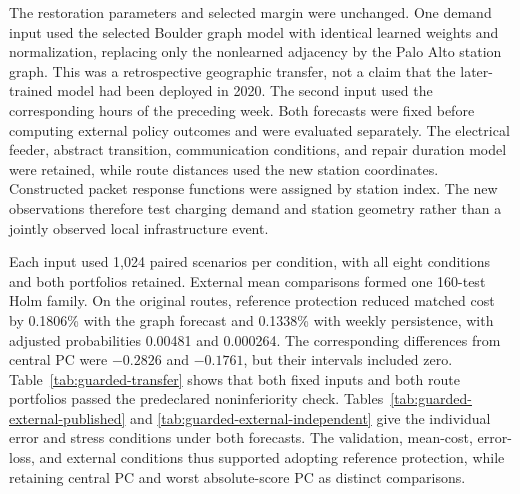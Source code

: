 The restoration parameters and selected margin were unchanged.  One demand
input used the selected Boulder graph model with identical learned weights
and normalization, replacing only the nonlearned adjacency by the Palo Alto
station graph.  This was a retrospective geographic transfer, not a claim
that the later-trained model had been deployed in 2020.  The second input
used the corresponding hours of the preceding week.  Both forecasts were
fixed before computing external policy outcomes and were evaluated separately.
The electrical feeder, abstract transition, communication conditions, and
repair duration model were retained, while route distances used the new
station coordinates.  Constructed packet response functions were assigned
by station index.  The new observations therefore test charging demand and
station geometry rather than a jointly observed local infrastructure event.



Each input used 1,024 paired scenarios per condition, with all eight
conditions and both portfolios retained.  External mean comparisons formed
one 160-test Holm family.  On the original routes, reference protection
reduced matched cost by 0.1806\% with the graph forecast and 0.1338\% with
weekly persistence, with adjusted probabilities 0.00481 and 0.000264.
The corresponding differences from central PC were $-0.2826$ and $-0.1761$,
but their intervals included zero.  Table~\ref{tab:guarded-transfer} shows
that both fixed inputs and both route portfolios passed the predeclared
noninferiority check. Tables~\ref{tab:guarded-external-published} and
\ref{tab:guarded-external-independent} give the individual error and stress
conditions under both forecasts. The validation, mean-cost, error-loss, and external
conditions thus supported adopting reference protection, while retaining
central PC and worst absolute-score PC as distinct comparisons.

